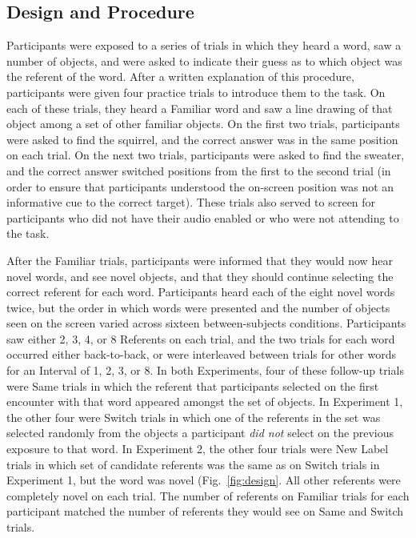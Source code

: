 \documentclass{pnastwo}
\begin{document}
\begin{article}
\begin{materials}
\subsection{Design and Procedure}
Participants were exposed to a series of trials in which they heard a word, saw a number of objects, and were asked to indicate their guess as to which object was the referent of the word. After a written explanation of this procedure, participants were given four practice trials to introduce them to the task. On each of these trials, they heard a Familiar word and saw a line drawing of that object among a set of other familiar objects. On the first two trials, participants were asked to find the squirrel, and the correct answer was in the same position on each trial. On the next two trials, participants were asked to find the sweater, and the correct answer switched positions from the first to the second trial (in order to ensure that participants understood the on-screen position was not an informative cue to the correct target). These trials also served to screen for participants who did not have their audio enabled or who were not attending to the task.

After the Familiar trials, participants were informed that they would now hear novel words, and see novel objects, and that they should continue selecting the correct referent for each word. Participants heard each of the eight novel words twice, but the order in which words were presented and the number of objects seen on the screen varied across sixteen between-subjects conditions. Participants saw either 2, 3, 4, or 8 Referents on each trial, and the two trials for each word occurred either back-to-back, or were interleaved between trials for other words for an Interval of 1, 2, 3, or 8. In both Experiments, four of these follow-up trials were Same trials in which the referent that participants selected on the first encounter with that word appeared amongst the set of objects. In Experiment 1, the other four were Switch trials in which one of the referents in the set was selected randomly from the objects a participant \emph{did not} select on the previous exposure to that word. In Experiment 2, the other four trials were New Label trials in which set of candidate referents was the same as on Switch trials in Experiment 1, but the word was novel (Fig.~\ref{fig:design}. All other referents were completely novel on each trial. The number of referents on Familiar trials for each participant matched the number of referents they would see on Same and Switch trials.


\end{materials}
\end{article}
\end{document}
